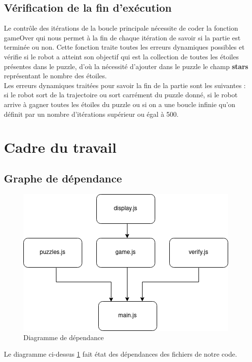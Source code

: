 \documentclass[11pt]{article}
\begin{document}
\subsection{Vérification de la fin d'exécution }
Le contrôle des itérations de la boucle principale nécessite de coder la fonction gameOver qui nous permet à la fin de chaque itération de savoir si la partie est terminée ou non. Cette fonction traite toutes les erreurs dynamiques possibles et vérifie si le robot a atteint son objectif qui est la collection de toutes les étoiles présentes dans le puzzle, d'où la nécessité d'ajouter dans le puzzle le champ \textbf{stars} représentant le nombre des étoiles. \\
Les erreurs dynamiques traitées pour savoir la fin de la partie sont les suivantes : si le robot sort de la trajectoire ou sort carrément du puzzle donné, si le robot arrive à gagner toutes les étoiles du puzzle ou si on a une boucle infinie qu'on définit par un nombre d'itérations supérieur ou égal à 500.


\section{Cadre du travail}
\subsection{Graphe de dépendance}

\begin{figure}[h]
    \centering
    \includegraphics{Untitled Diagram.drawio(1).png}
    \caption{Diagramme de dépendance }
    \label{fig:Diagramme}
\end{figure}
Le diagramme ci-dessus \ref{fig:Diagramme} fait état des dépendances des fichiers de notre code.\\
\end{document}

